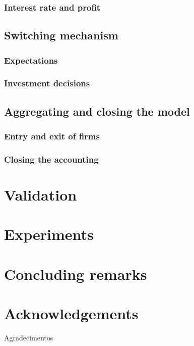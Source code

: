 \documentclass{SelfArx}
\begin{document}
\subsubsection*{Interest rate and profit}
\label{sec:org9d06929}

\subsection*{Switching mechanism}
\label{sec:switching}
\subsubsection*{Expectations}
\label{sec:orgd336c6d}

\subsubsection*{Investment decisions}
\label{sec:orgb92e62e}



\subsection*{Aggregating and closing the model}
\label{sec:org62252b2}

\subsubsection*{Entry and exit of firms}
\label{sec:orga61a073}
\subsubsection*{Closing the accounting}
\label{sec:orgbf000ae}

\section*{Validation}
\label{sec:orge6e9ec5}
\section*{Experiments}
\label{sec:org5dfe25f}
\section*{Concluding remarks}
\label{sec:org1e3d8cc}

\section*{Acknowledgements}
\label{sec:orga36283c}

Agradecimentos


\printbibliography
\end{document}
